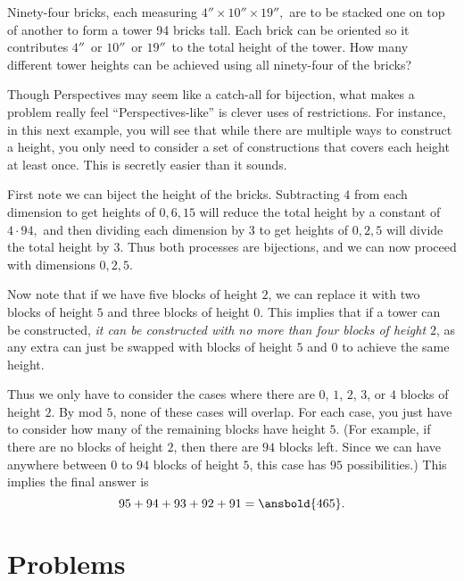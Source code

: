 \documentclass[mast]{lucky}
\begin{document}
\begin{exam}[AIME 1994/11]
Ninety-four bricks, each measuring $4''\times10''\times19'',$ are to be stacked one on top of another to form a tower 94 bricks tall. Each brick can be oriented so it contributes $4''\,$ or $10''\,$ or $19''\,$ to the total height of the tower. How many different tower heights can be achieved using all ninety-four of the bricks? 
\end{exam}

Though Perspectives may seem like a catch-all for bijection, what makes a problem really feel ``Perspectives-like'' is clever uses of restrictions. For instance, in this next example, you will see that while there are multiple ways to construct a height, you only need to consider a set of constructions that covers each height at least once. This is secretly easier than it sounds.

\begin{sol}
First note we can biject the height of the bricks. Subtracting $4$ from each dimension to get heights of $0, 6, 15$ will reduce the total height by a constant of $4\cdot 94,$ and then dividing each dimension by $3$ to get heights of $0, 2, 5$ will divide the total height by $3$. Thus both processes are bijections, and we can now proceed with dimensions $0, 2, 5$.

Now note that if we have five blocks of height $2$, we can replace it with two blocks of height $5$ and three blocks of height $0$. This implies that if a tower can be constructed, \emph{it can be constructed with no more than four blocks of height $2$}, as any extra can just be swapped with blocks of height $5$ and $0$ to achieve the same height.

Thus we only have to consider the cases where there are $0$, $1$, $2$, $3$, or $4$ blocks of height $2$. By mod $5$, none of these cases will overlap. For each case, you just have to consider how many of the remaining blocks have height $5$. (For example, if there are no blocks of height $2$, then there are $94$ blocks left. Since we can have anywhere between $0$ to $94$ blocks of height $5$, this case has $95$ possibilities.) This implies the final answer is
\[95+94+93+92+91=\ansbold{465}.\]
\end{sol}

\pagebreak

\section{Problems}
\end{document}
